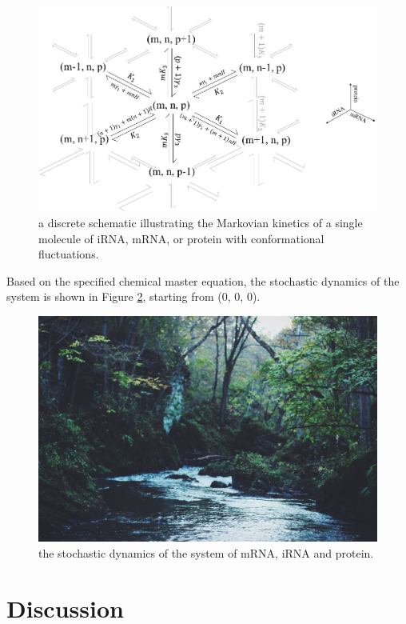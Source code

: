 \documentclass[fleqn,10pt]{wlscirep}
\begin{document}
\begin{figure}[ht]
\centering
\includegraphics[width=\linewidth]{cme}
\caption{a discrete schematic illustrating the Markovian kinetics of a single molecule of iRNA, mRNA, or protein with conformational fluctuations.}
\label{fig:cme}
\end{figure}

Based on the specified chemical master equation, the stochastic dynamics of the system is shown in Figure \ref{fig:stochsim}, starting from (0, 0, 0).

\begin{figure}[ht]
\centering
\includegraphics[width=\linewidth]{stochsim}
\caption{the stochastic dynamics of the system of mRNA, iRNA and protein.}
\label{fig:stochsim}
\end{figure}

\section*{Discussion}
\end{document}
